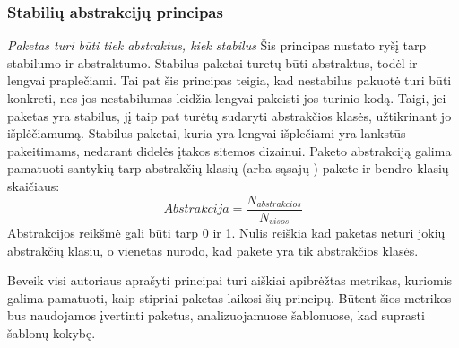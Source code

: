 \subsubsection{Stabilių abstrakcijų principas}
\textit{Paketas turi būti tiek abstraktus, kiek stabilus}
Šis principas nustato ryšį tarp stabilumo ir abstraktumo.
Stabilus paketai turetų būti abstraktus, todėl ir lengvai praplečiami.
Tai pat šis principas teigia, kad nestabilus pakuotė turi būti konkreti, nes jos nestabilumas leidžia lengvai pakeisti jos turinio kodą.
Taigi, jei paketas yra stabilus, jį taip pat turėtų sudaryti abstrakčios klasės, užtikrinant jo išplėčiamumą.
Stabilus paketai, kuria yra lengvai išplečiami yra lankstūs pakeitimams, nedarant didelės įtakos sitemos dizainui\cite{AgileSoftwareDevelopment}.
Paketo abstrakciją galima pamatuoti santykių tarp abstrakčių klasių (arba sąsajų ) pakete ir bendro klasių skaičiaus:
\begin{equation}
    Abstrakcija=\frac{N_{abstrakcios}}{N_{visos}}
\end{equation}
Abstrakcijos reikšmė gali būti tarp 0 ir 1.
Nulis reiškia kad paketas neturi jokių abstrakčių klasiu, o vienetas nurodo, kad pakete yra tik abstrakčios klasės.

Beveik visi autoriaus aprašyti principai turi aiškiai apibrėžtas metrikas, kuriomis galima pamatuoti, kaip stipriai paketas laikosi šių principų.
Būtent šios metrikos bus naudojamos įvertinti paketus, analizuojamuose šablonuose, kad suprasti šablonų kokybę.

